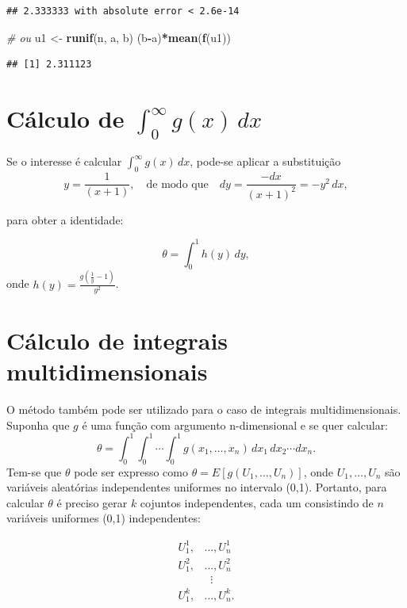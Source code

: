 \documentclass[
]{book}
\newenvironment{Shaded}{\begin{snugshade}}{\end{snugshade}}
\newcommand{\CommentTok}[1]{\textcolor[rgb]{0.56,0.35,0.01}{\textit{#1}}}
\newcommand{\FunctionTok}[1]{\textcolor[rgb]{0.13,0.29,0.53}{\textbf{#1}}}
\newcommand{\NormalTok}[1]{#1}
\newcommand{\OtherTok}[1]{\textcolor[rgb]{0.56,0.35,0.01}{#1}}
\newcommand{\SpecialCharTok}[1]{\textcolor[rgb]{0.81,0.36,0.00}{\textbf{#1}}}
\begin{document}
\begin{verbatim}
## 2.333333 with absolute error < 2.6e-14
\end{verbatim}

\begin{Shaded}
\begin{Highlighting}[]
\CommentTok{\# ou}
\NormalTok{u1 }\OtherTok{\textless{}{-}} \FunctionTok{runif}\NormalTok{(n, a, b)}
\NormalTok{(b}\SpecialCharTok{{-}}\NormalTok{a)}\SpecialCharTok{*}\FunctionTok{mean}\NormalTok{(}\FunctionTok{f}\NormalTok{(u1))}
\end{Highlighting}
\end{Shaded}

\begin{verbatim}
## [1] 2.311123
\end{verbatim}

\section{\texorpdfstring{Cálculo de \(\int_{0}^{\infty}g(x)\, dx\)}{Cálculo de \textbackslash int\_\{0\}\^{}\{\textbackslash infty\}g(x)\textbackslash, dx}}\label{cuxe1lculo-de-int_0inftygx-dx}

Se o interesse é calcular \(\int_{0}^{\infty}g(x)\, dx\), pode-se aplicar
a substituição
\[y=\frac{1}{(x+1)}, \quad \text{de modo que} \quad dy=\frac{-dx}{(x+1)^2}=-y^2\,dx,\]

para obter a identidade:

\[\theta = \int_{0}^{1}h(y)\,dy,\] onde
\(h(y)=\frac{g(\frac{1}{y}-1)}{y^2}\).

\section{Cálculo de integrais multidimensionais}\label{cuxe1lculo-de-integrais-multidimensionais}

O método também pode ser utilizado para o caso de integrais
multidimensionais. Suponha que \(g\) é uma função com argumento
n-dimensional e se quer calcular:
\[\theta = \int_{0}^{1}\int_{0}^{1}\cdots \int_{0}^{1} g(x_1, \ldots,x_n)\, dx_1 \, dx_2\cdots dx_n.\]
Tem-se que \(\theta\) pode ser expresso como
\(\theta = E[g(U_1,\ldots,U_n)]\), onde \(U_1,\ldots,U_n\) são variáveis
aleatórias independentes uniformes no intervalo (0,1). Portanto, para
calcular \(\theta\) é preciso gerar \(k\) cojuntos independentes, cada um
consistindo de \(n\) variáveis uniformes (0,1) independentes:

\begin{align*}
U_{1}^{1},&\ldots,U_{n}^{1} \\
U_{1}^{2},&\ldots,U_{n}^{2} \\
& \;\;\vdots \\
U_{1}^{k},&\ldots,U_{n}^{k}.
\end{align*}
\end{document}
